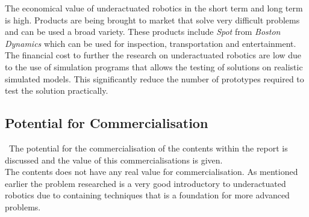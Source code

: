 The economical value of underactuated robotics in the short term and long term is high. Products are being brought to market that solve very difficult problems and can be used a broad variety. These products include \textit{Spot} from \textit{Boston Dynamics} which can be used for inspection, transportation and entertainment.\\

The financial cost to further the research on underactuated robotics are low due to the use of simulation programs that allows the testing of solutions on realistic simulated models. This significantly reduce the number of prototypes required to test the solution practically. 

\subsection{Potential for Commercialisation}\
The potential for the commercialisation of the contents within the report is discussed and the value of this commercialisations is given.\\

The contents does not have any real value for commercialisation. As mentioned earlier the problem researched is a very good introductory to underactuated robotics due to containing techniques that is a foundation for more advanced problems. 




\endinput
